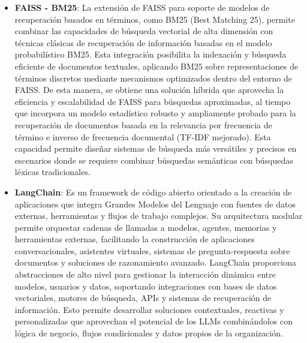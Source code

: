 \begin{itemize}
    \item \textbf{FAISS - BM25}: La extensión de FAISS para soporte de modelos de recuperación basados en términos, como BM25 (Best Matching 25), permite combinar las capacidades de búsqueda vectorial de alta dimensión con técnicas clásicas de recuperación de información basadas en el modelo probabilístico BM25. 
    Esta integración posibilita la indexación y búsqueda eficiente de documentos textuales, aplicando BM25 sobre representaciones de términos discretos mediante mecanismos optimizados dentro del entorno de FAISS. 
    De esta manera, se obtiene una solución híbrida que aprovecha la eficiencia y escalabilidad de FAISS para búsquedas aproximadas, al tiempo que incorpora un modelo estadístico robusto y ampliamente probado para la recuperación de documentos basada en la relevancia por frecuencia de término e inverso de frecuencia documental (TF-IDF mejorado). 
    Esta capacidad permite diseñar sistemas de búsqueda más versátiles y precisos en escenarios donde se requiere combinar búsquedas semánticas con búsquedas léxicas tradicionales.
    
    \item \textbf{LangChain}: Es un framework de código abierto orientado a la creación de aplicaciones que integra Grandes Modelos del Lenguaje con fuentes de datos externas, herramientas y flujos de trabajo complejos. 
    Su arquitectura modular permite orquestar cadenas de llamadas a modelos, agentes, memorias y herramientas externas, facilitando la construcción de aplicaciones conversacionales, asistentes virtuales, sistemas de pregunta-respuesta sobre documentos y soluciones de razonamiento avanzado. 
    LangChain proporciona abstracciones de alto nivel para gestionar la interacción dinámica entre modelos, usuarios y datos, soportando integraciones con bases de datos vectoriales, motores de búsqueda, APIs y sistemas de recuperación de información. 
    Esto permite desarrollar soluciones contextuales, reactivas y personalizadas que aprovechan el potencial de los LLMs combinándolos con lógica de negocio, flujos condicionales y datos propios de la organización.
    

\end{itemize}
